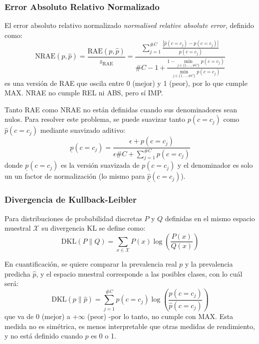 \subsubsection{Error Absoluto Relativo Normalizado}\label{evaluacion:nrae}

El error absoluto relativo normalizado {\it normalised relative absolute error},
definido como:
\begin{equation}
    {\text{NRAE}(p, \hat p)} = \frac{\text{RAE}(p, \hat p)}{z_{\text{RAE}}} = \frac{\sum \limits_{j=1}^{\#C}{\frac{|\hat p(c=c_j) - p(c=c_j)|}{p(c=c_j)}}}{\#C - 1 + \frac {1 - \displaystyle \min_{j\in\{1,\dots,\#C\}}p(c=c_j)}{\displaystyle \min_{j\in\{1,\dots,\#C\}}p(c=c_j)}}\label{evaluacion:eq_nrae}
\end{equation}
es una versión de RAE que oscila entre 0 (mejor) y 1 (peor), por lo que cumple
MAX. NRAE no cumple REL ni ABS, pero sí IMP.

Tanto RAE como NRAE no están definidas cuando sus denominadores sean nulos. Para
resolver este problema, se puede suavizar tanto $p(c=c_j)$ como $\hat p(c=c_j)$
mediante suavizado aditivo:
\begin{equation}
    \underline p(c=c_j) = \frac{\epsilon + p(c=c_j)}{\epsilon  \#C + \sum \limits_{j=1}^{\#C}{p(c=c_j)}}\label{evaluacion:eq_suav_rae_nrae}
\end{equation}
donde $\underline p(c=c_j)$ es la versión suavizada de $p(c=c_j)$ y el
denominador es solo un un factor de normalización (lo mismo para $\underline
{\hat p}(c=c_j)$).

\subsubsection{Divergencia de Kullback-Leibler}\label{evaluacion:dkl}

Para distribuciones de probabilidad discretas $P$ y $Q$ definidas en el mismo
espacio muestral ${\mathcal {X}}$ su divergencia KL se define como:
\begin{equation}
    {\text{DKL}}(P\parallel Q)=\sum \limits_{x\in {\mathcal {X}}}P(x)\log \left({\frac {P(x)}{Q(x)}}\right)\label{evaluacion:eq_dkl}
\end{equation}

En cuantificación, se quiere comparar la prevalencia real $p$ y la prevalencia
predicha $\hat{p}$, y el espacio muestral corresponde a las posibles clases, con
lo cuál será:
\begin{equation}
    {\text{DKL}}(p\parallel \hat{p}) = \sum \limits_{j=1}^{\#C}p(c=c_j)\log \left({\frac {p(c=c_j)}{\hat p(c=c_j)}}\right)\label{evaluacion:eq_dkl2}
\end{equation}
que va de {0} (mejor) a {+$\infty$} (peor) -por lo tanto, no cumple con MAX.
Esta medida no es simétrica, es menos interpretable que otras medidas de
rendimiento, y no está definido cuando $\hat{p}$ es 0 o 1.

